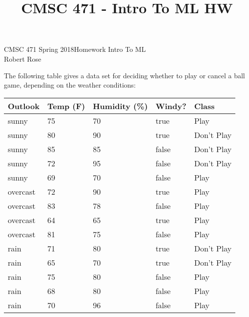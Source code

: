 \documentclass[12pt]{article}
\title{CMSC 471 - Intro To ML HW}
\begin{document}
CMSC 471 Spring 2018\hfill Homework Intro To ML\\
Robert Rose

\hrulefill

The following table gives a data set for deciding whether to play or cancel a ball game, depending on the weather conditions:\\

\begin{center}
\begin{tabular}{l|l|l|l|l}
      \textbf{Outlook} & \textbf{Temp (F)} & \textbf{Humidity (\%)} & \textbf{Windy?} & \textbf{Class}\\
      \hline
      sunny & 75 & 70 & true & Play\\
      sunny & 80 & 90 & true & Don't Play\\
      sunny & 85 & 85 & false & Don't Play\\
        sunny & 72 & 95 & false & Don't Play\\
      sunny & 69 & 70 & false & Play\\
      overcast & 72 & 90 & true & Play\\
      overcast & 83 & 78 & false & Play\\
      overcast & 64 & 65 & true & Play\\
      overcast & 81 & 75 & false & Play\\
      rain & 71 & 80 & true & Don't Play\\
      rain & 65 & 70 & true & Don't Play\\
      rain & 75 & 80 & false & Play\\
      rain & 68 & 80 & false & Play\\
      rain & 70 & 96 & false & Play
\end{tabular}
\end{center}
\end{document}
